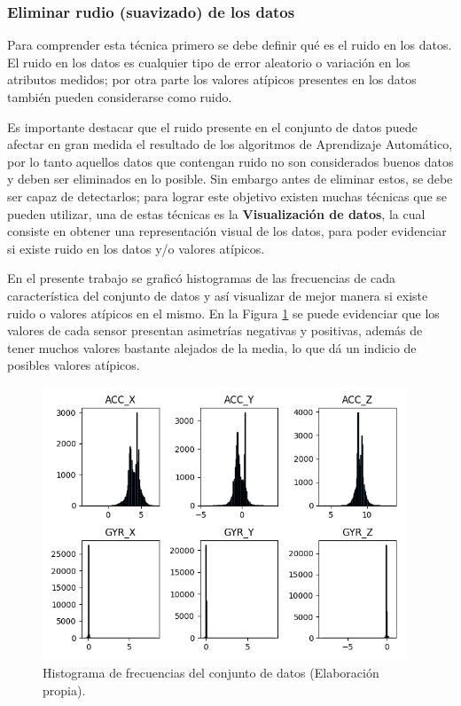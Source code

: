 \subsubsection{Eliminar rudio (suavizado) de los datos}

Para comprender esta t\'{e}cnica primero se debe definir qu\'{e} es el ruido en los datos. El ruido en los datos es cualquier tipo de error aleatorio o variaci\'{o}n en los atributos medidos; por otra parte los valores at\'{i}picos presentes en los datos tambi\'{e}n pueden considerarse como ruido. 

\vspace{5mm} %

Es importante destacar que el ruido presente en el conjunto de datos puede afectar en gran medida el resultado de los algoritmos de Aprendizaje Autom\'{a}tico, por lo tanto aquellos datos que contengan ruido no son considerados buenos datos y deben ser eliminados en lo posible. Sin embargo antes de eliminar estos, se debe ser capaz de detectarlos; para lograr este objetivo existen muchas t\'{e}cnicas que se pueden utilizar, una de estas t\'{e}cnicas es la \textbf{Visualizaci\'{o}n de datos}, la cual consiste en obtener una representaci\'{o}n visual de los datos, para poder evidenciar si existe ruido en los datos y/o valores at\'{i}picos.

\vspace{5mm} %

En el presente trabajo se grafic\'{o} histogramas de las frecuencias de cada caracter\'{i}stica del conjunto de datos y as\'{i} visualizar de mejor manera si existe ruido o valores at\'{i}picos en el mismo. En la Figura \ref{fig:hist} se puede evidenciar que los valores de cada sensor presentan asimetr\'{i}as negativas y positivas, adem\'{a}s de tener muchos valores bastante alejados de la media, lo que d\'{a} un indicio de posibles valores at\'{i}picos.

\begin{figure}[h!]
  \begin{center}	\includegraphics[width=0.97\textwidth,frame]{imagenes/Cap3/histograma_sensores}
  \caption{Histograma de frecuencias del conjunto de datos (Elaboraci\'{o}n propia).}
  \label{fig:hist}
  \end{center}
\end{figure}

